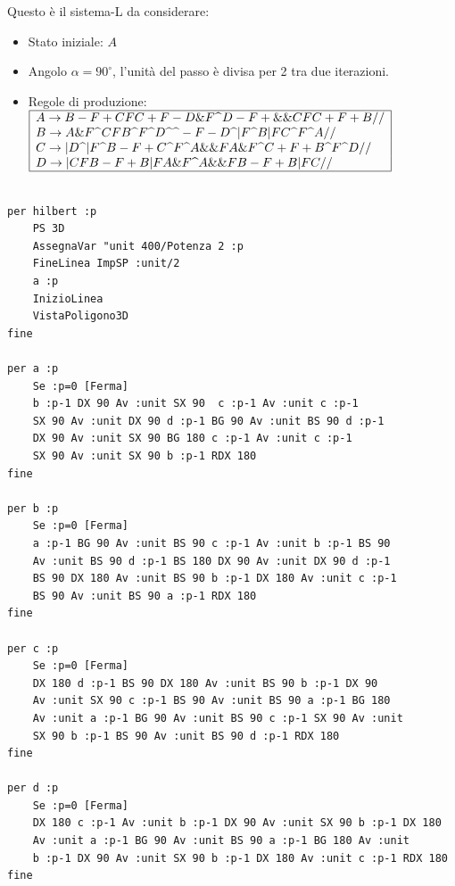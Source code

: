 Questo è il sistema-L da considerare:
\begin{itemize}
	\item Stato iniziale: $A$
	\item Angolo $\alpha=90^{\circ}$, l'unità del passo è divisa per 2 tra due iterazioni.\\
	\item Regole di produzione:
	$
	\begin{array}{|l|}
		\hline
		A\rightarrow B-F+CFC+F-D\&F \textrm{\textrm{\textasciicircum}} D-F+\&\&CFC+F+B// \\
		B\rightarrow A\&F\textrm{\textrm{\textasciicircum}} CFB\textrm{\textasciicircum} F \textrm{\textasciicircum} D\textrm{\textasciicircum} \textrm{\textasciicircum}-F-D\textrm{\textasciicircum}|F\textrm{\textasciicircum} B|FC\textrm{\textasciicircum} F\textrm{\textasciicircum} A// \\
		C\rightarrow|D\textrm{\textasciicircum}|F\textrm{\textasciicircum} B-F+C\textrm{\textasciicircum} F\textrm{\textasciicircum} A\&\&FA\&F\textrm{\textasciicircum} C+F+B\textrm{\textasciicircum} F\textrm{\textasciicircum} D// \\
		D\rightarrow|CFB-F+B|FA\&F\textrm{\textasciicircum} A\&\&FB-F+B|FC// \\
		\hline
	\end{array}
	$
\end{itemize}

\begin{lstlisting}[caption="Curva 3D di Hilbert"]

per hilbert :p
	PS 3D
	AssegnaVar "unit 400/Potenza 2 :p
	FineLinea ImpSP :unit/2
	a :p
	InizioLinea
	VistaPoligono3D
fine

per a :p
	Se :p=0 [Ferma]
	b :p-1 DX 90 Av :unit SX 90  c :p-1 Av :unit c :p-1
	SX 90 Av :unit DX 90 d :p-1 BG 90 Av :unit BS 90 d :p-1
	DX 90 Av :unit SX 90 BG 180 c :p-1 Av :unit c :p-1
	SX 90 Av :unit SX 90 b :p-1 RDX 180
fine

per b :p
	Se :p=0 [Ferma]
	a :p-1 BG 90 Av :unit BS 90 c :p-1 Av :unit b :p-1 BS 90 
	Av :unit BS 90 d :p-1 BS 180 DX 90 Av :unit DX 90 d :p-1 
	BS 90 DX 180 Av :unit BS 90 b :p-1 DX 180 Av :unit c :p-1 
	BS 90 Av :unit BS 90 a :p-1 RDX 180 
fine

per c :p
	Se :p=0 [Ferma]
	DX 180 d :p-1 BS 90 DX 180 Av :unit BS 90 b :p-1 DX 90
	Av :unit SX 90 c :p-1 BS 90 Av :unit BS 90 a :p-1 BG 180
 	Av :unit a :p-1 BG 90 Av :unit BS 90 c :p-1 SX 90 Av :unit 
	SX 90 b :p-1 BS 90 Av :unit BS 90 d :p-1 RDX 180 
fine

per d :p
	Se :p=0 [Ferma]
	DX 180 c :p-1 Av :unit b :p-1 DX 90 Av :unit SX 90 b :p-1 DX 180
	Av :unit a :p-1 BG 90 Av :unit BS 90 a :p-1 BG 180 Av :unit
	b :p-1 DX 90 Av :unit SX 90 b :p-1 DX 180 Av :unit c :p-1 RDX 180
fine
\end{lstlisting}

